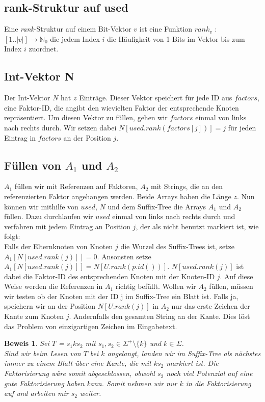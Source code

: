 \documentclass[a4paper,11pt]{scrartcl}%
\theoremstyle{change}
\theoremstyle{nonumberplain}
\theoremstyle{change}
\theoremstyle{nonumberplain}
\newtheorem{beweis}{Beweis}
\theoremstyle{change}
\theoremstyle{nonumberplain}
\begin{document}
\subsection{rank-Struktur auf used}

Eine \textit{rank}-Struktur auf einem Bit-Vektor $v$ ist eine Funktion $rank_v$ : $[1..|v|] \rightarrow \mathbb{N}_0$ die jedem Index $i$ die Häufigkeit von 1-Bits im Vektor bis zum Index $i$ zuordnet\cite[S. 39]{munroTables}.


\subsection{Int-Vektor N}

Der Int-Vektor $N$ hat $z$ Einträge. Dieser Vektor speichert für jede ID aus $factors$, eine Faktor-ID, die angibt den wievielten Faktor der entsprechende Knoten repräsentiert. Um diesen Vektor zu füllen, gehen wir $factors$ einmal von links nach rechts durch. Wir setzen dabei $N[used.rank(factors[j])] = j$ für jeden Eintrag in $factors$ an der Position $j$.
 


\subsection{Füllen von $A_1$ und $A_2$}

$A_1$ füllen wir mit Referenzen auf Faktoren, $A_2$ mit Strings, die an den referenzierten Faktor angehangen werden. Beide Arrays haben die Länge $z$.
Nun können wir mithilfe von $used$, $N$ und dem Suffix-Tree die Arrays $A_1$ und $A_2$ füllen. Dazu durchlaufen wir $used$ einmal von links nach rechts durch und verfahren mit jedem Eintrag an Position $j$, der als nicht benutzt markiert ist, wie folgt:\\
Falls der Elternknoten von Knoten $j$  die Wurzel des Suffix-Trees ist, setze \\$A_1[N[used.rank(j)]] = 0$. Ansonsten setze $A_1[N[used.rank(j)]] = N[U.rank(p.id())]$.
$N[used.rank(j)]$ ist dabei die Faktor-ID des entsprechenden Knoten mit der Knoten-ID $j$. 
Auf diese Weise werden die Referenzen in $A_1$ richtig befüllt. Wollen wir $A_2$ füllen, müssen wir testen ob der Knoten mit der ID j im Suffix-Tree ein Blatt ist. Falls ja, speichern wir an der Position $N[U.rank(j)]$ in $A_2$ nur das erste Zeichen der Kante zum Knoten $j$. Andernfalls den gesamten String an der Kante. Dies löst das Problem von einzigartigen Zeichen im Eingabetext.

\begin{beweis}
	Sei $T$ = $s_1ks_2$ mit $s_1,s_2 \in \Sigma^+ \setminus \{k\}$ und $k \in \Sigma$. \\
	Sind wir beim Lesen von $T$ bei $k$ angelangt, landen wir im Suffix-Tree als nächstes immer zu einem Blatt über eine Kante, die mit $ks_2$ markiert ist.
	Die Faktorisierung wäre somit abgeschlossen, obwohl $s_2$ noch viel Potenzial auf eine gute Faktorisierung haben kann. Somit nehmen wir nur $k$ in die Faktorisierung auf und arbeiten mir $s_2$ weiter.
\end{beweis}
\end{document}
